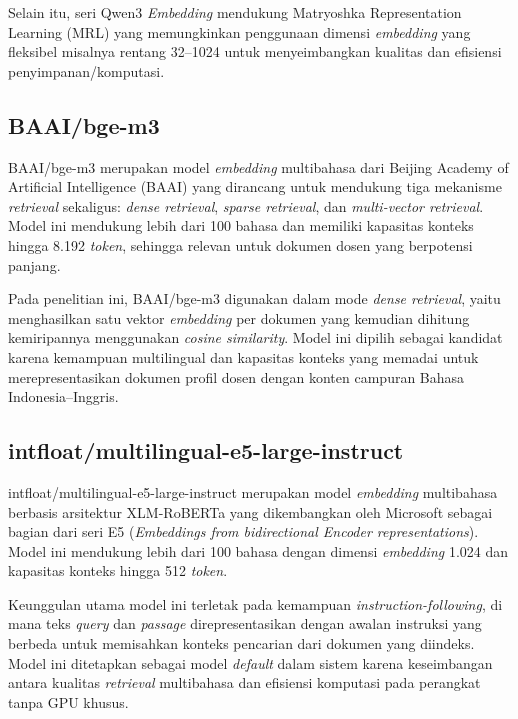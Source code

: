 Selain itu, seri Qwen3 \textit{Embedding} mendukung Matryoshka Representation Learning (MRL) yang memungkinkan penggunaan dimensi \textit{embedding} yang fleksibel misalnya rentang 32--1024 untuk menyeimbangkan kualitas dan efisiensi penyimpanan/komputasi.

\subsection{BAAI/bge-m3}\label{baai-bge-m3}

BAAI/bge-m3 merupakan model \textit{embedding} multibahasa dari Beijing Academy of Artificial Intelligence (BAAI) yang dirancang untuk mendukung tiga mekanisme \textit{retrieval} sekaligus: \textit{dense retrieval}, \textit{sparse retrieval}, dan \textit{multi-vector retrieval}. Model ini mendukung lebih dari 100 bahasa dan memiliki kapasitas konteks hingga 8.192 \textit{token}, sehingga relevan untuk dokumen dosen yang berpotensi panjang.

Pada penelitian ini, BAAI/bge-m3 digunakan dalam mode \textit{dense retrieval}, yaitu menghasilkan satu vektor \textit{embedding} per dokumen yang kemudian dihitung kemiripannya menggunakan \textit{cosine similarity}. Model ini dipilih sebagai kandidat karena kemampuan multilingual dan kapasitas konteks yang memadai untuk merepresentasikan dokumen profil dosen dengan konten campuran Bahasa Indonesia--Inggris.

\subsection{intfloat/multilingual-e5-large-instruct}\label{multilingual-e5-large-instruct}

intfloat/multilingual-e5-large-instruct merupakan model \textit{embedding} multibahasa berbasis arsitektur XLM-RoBERTa yang dikembangkan oleh Microsoft sebagai bagian dari seri E5 (\textit{Embeddings from bidirectional Encoder representations}). Model ini mendukung lebih dari 100 bahasa dengan dimensi \textit{embedding} 1.024 dan kapasitas konteks hingga 512 \textit{token}.

Keunggulan utama model ini terletak pada kemampuan \textit{instruction-following}, di mana teks \textit{query} dan \textit{passage} direpresentasikan dengan awalan instruksi yang berbeda untuk memisahkan konteks pencarian dari dokumen yang diindeks. Model ini ditetapkan sebagai model \textit{default} dalam sistem karena keseimbangan antara kualitas \textit{retrieval} multibahasa dan efisiensi komputasi pada perangkat tanpa GPU khusus.


